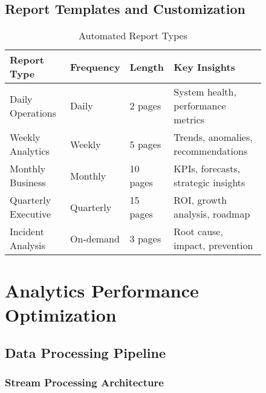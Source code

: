\begin{figure}[H]
\subsection{Report Templates and Customization}

\begin{table}[H]
\centering
\caption{Automated Report Types}
\begin{tabular}{|p{3cm}|p{3cm}|p{2cm}|p{4cm}|}
\hline
\textbf{Report Type} & \textbf{Frequency} & \textbf{Length} & \textbf{Key Insights} \\
\hline
Daily Operations & Daily & 2 pages & System health, performance metrics \\
\hline
Weekly Analytics & Weekly & 5 pages & Trends, anomalies, recommendations \\
\hline
Monthly Business & Monthly & 10 pages & KPIs, forecasts, strategic insights \\
\hline
Quarterly Executive & Quarterly & 15 pages & ROI, growth analysis, roadmap \\
\hline
Incident Analysis & On-demand & 3 pages & Root cause, impact, prevention \\
\hline
\end{tabular}
\end{table}

\section{Analytics Performance Optimization}

\subsection{Data Processing Pipeline}

\subsubsection{Stream Processing Architecture}

\begin{figure}[H]
\centering
{}
\end{figure}
\end{figure}
